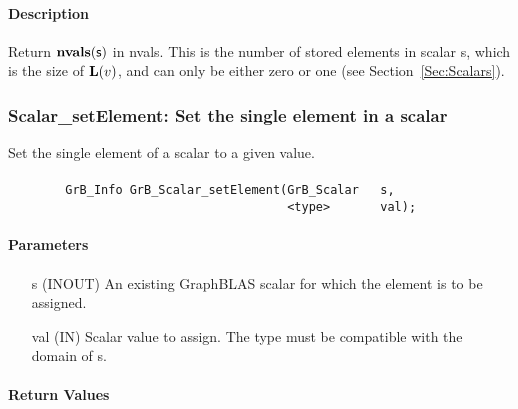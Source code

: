 \paragraph{Description}


Return $\mathbf{nvals}({\sf s})$ in {\sf nvals}. This is the number of stored 
elements in scalar {\sf s}, which is the size of $\mathbf{L}({v})$, and
can only be either zero or one (see Section~\ref{Sec:Scalars}).

\subsubsection{{\sf Scalar\_setElement}: Set the single element in a scalar}

Set the single element of a scalar to a given value.

\paragraph{\syntax}

\begin{verbatim}
        GrB_Info GrB_Scalar_setElement(GrB_Scalar   s,
                                       <type>       val);
\end{verbatim}

\paragraph{Parameters}

\begin{itemize}[leftmargin=1.1in]
    \item[{\sf s}]   ({\sf INOUT}) An existing GraphBLAS scalar for which the 
    element is to be assigned.

    \item[{\sf val}]   ({\sf IN}) Scalar value to assign.  The type must
    be compatible with the domain of {\sf s}.
\end{itemize}

\paragraph{Return Values}

